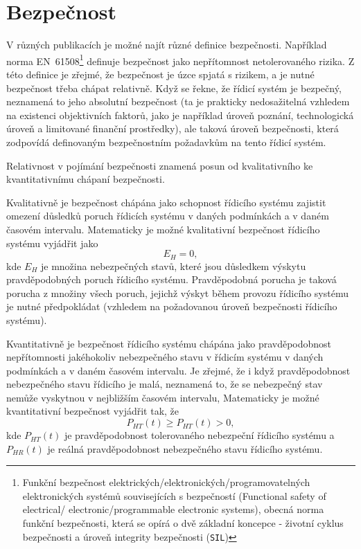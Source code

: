  \section{Bezpečnost}
    V různých publikacích je možné najít různé definice bezpečnosti. Například norma 
    EN~61508\footnote{Funkční bezpečnost elektrických/elektronických/programovatelných 
    elektronických systémů souvisejících s bezpečností (Functional safety of electrical/ 
    electronic/programmable electronic systems), obecná norma funkční bezpečnosti, která se opírá o 
    dvě základní koncepce - životní cyklus bezpečnosti a úroveň integrity bezpečnosti 
    (\texttt{SIL})} 
    definuje bezpečnost jako nepřítomnost netolerovaného rizika. Z této definice je zřejmé, že 
    bezpečnost je úzce spjatá s rizikem, a je nutné bezpečnost třeba chápat relativně. Když se 
    řekne, že řídicí systém je bezpečný, neznamená to jeho absolutní bezpečnost (ta je prakticky 
    nedosažitelná vzhledem na existenci objektivních faktorů, jako je například úroveň poznání, 
    technologická úroveň a limitované finanční prostředky), ale taková úroveň bezpečnosti, 
    která zodpovídá definovaným bezpečnostním požadavkům na tento řídicí systém. 

    Relativnost v pojímání bezpečnosti znamená posun od kvalitativního ke kvantitativnímu chápaní bezpečnosti.

    Kvalitativně je bezpečnost chápána jako schopnost řídicího systému zajistit omezení důsledků 
    poruch řídicích systému v daných podmínkách a v daném časovém intervalu. Matematicky je možné 
    kvalitativní bezpečnost řídicího systému vyjádřit jako 
    \begin{equation}
      E_H = 0,
    \end{equation}
    kde \(E_H\) je množina nebezpečných stavů, které jsou důsledkem výskytu pravděpodobných poruch 
    řídicího systému. Pravděpodobná porucha je taková porucha z množiny všech poruch, jejichž 
    výskyt během provozu řídicího systému je nutné předpokládat (vzhledem na požadovanou úroveň 
    bezpečnosti řídicího systému).
	
    Kvantitativně je bezpečnost řídicího systému chápána jako pravděpodobnost nepřítomnosti
    jakéhokoliv nebezpečného stavu v řídicím systému v daných podmínkách a v daném časovém
    intervalu. Je zřejmé, že i když pravděpodobnost nebezpečného stavu řídicího je malá, neznamená
    to, že se nebezpečný stav nemůže vyskytnou v nejbližším časovém intervalu, Matematicky je možné
    kvantitativní bezpečnost vyjádřit tak, že
    \begin{equation}
      P_{HT}(t)\geq P_{HT}(t)>0,
    \end{equation}
    kde \(P_{HT}(t)\) je pravděpodobnost tolerovaného nebezpeční řídicího systému a \(P_{HR}(t)\)
    je reálná pravděpodobnost nebezpeč\-ného stavu řídicího systému.
	 
